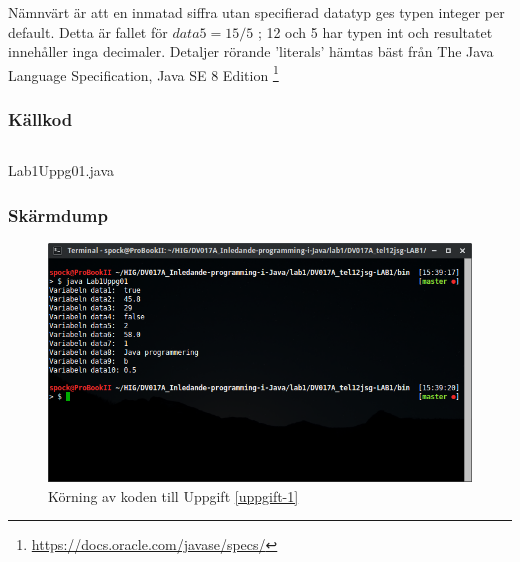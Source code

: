 
\par Nämnvärt är att en inmatad siffra utan specifierad datatyp ges typen
integer
per default. Detta är fallet för $data5 = 15 / 5$ ; 12 och 5 har typen int och
resultatet innehåller inga decimaler.  Detaljer rörande 'literals' hämtas bäst
från The Java Language Specification, Java SE 8 Edition
\footnote{\url{https://docs.oracle.com/javase/specs/}}



\subsubsection{Källkod}\label{uppgift-1_src}
    \inputminted[linenos]{java}{src/Lab1Uppg01.java}
    \caption{Lab1Uppg01.java}
    \label{Uppg1src}

\subsubsection{Skärmdump}
\begin{figure}[htbp]
    \centering
        \includegraphics[width=\linewidth]{img/01.png}
    \caption{Körning av koden till Uppgift \ref{uppgift-1}}
    \label{fig:screenshot-01}
\end{figure}

